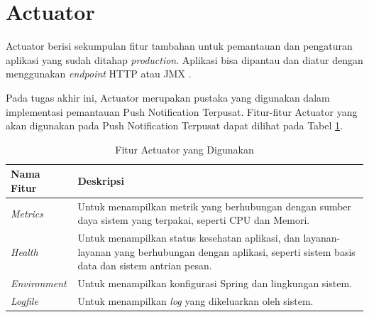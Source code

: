 \section{Actuator}
\par Actuator berisi sekumpulan fitur tambahan untuk pemantauan dan pengaturan aplikasi yang sudah ditahap \textit{production}. Aplikasi bisa dipantau dan diatur dengan menggunakan \textit{endpoint} HTTP atau JMX \cite{actuator-online}.
\par Pada tugas akhir ini, Actuator merupakan pustaka yang digunakan dalam implementasi pemantauan Push Notification Terpusat. Fitur-fitur Actuator yang akan digunakan pada Push Notification Terpusat dapat dilihat pada Tabel \ref{t:fitur-actuator}.
\begin{longtable}{|p{2cm}|p{6cm}|}
	\caption{Fitur Actuator yang Digunakan} \label{t:fitur-actuator} \\ \hline
 	\rowcolor{lightgray} Nama Fitur & Deskripsi \\ \hline
	\textit{Metrics} & Untuk menampilkan metrik yang berhubungan dengan sumber daya sistem yang terpakai, seperti CPU dan Memori. \\ \hline
	\textit{Health} & Untuk menampilkan status kesehatan aplikasi, dan layanan-layanan yang berhubungan dengan aplikasi, seperti sistem basis data dan sistem antrian pesan. \\ \hline
	\textit{Environment} & Untuk menampilkan konfigurasi Spring dan lingkungan sistem. \\ \hline
	\textit{Logfile} & Untuk menampilkan \textit{log} yang dikeluarkan oleh sistem. \\ \hline
\end{longtable}

